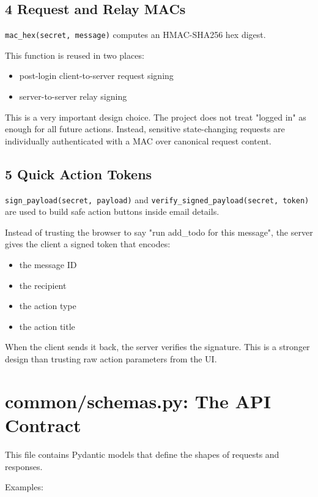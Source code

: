 \documentclass[11pt,a4paper]{article}
\begin{document}
\subsection{4 Request and Relay MACs}

\nolinkurl{mac_hex(secret, message)} computes an HMAC-SHA256 hex digest.

This function is reused in two places:

\begin{itemize}
\item post-login client-to-server request signing
\item server-to-server relay signing
\end{itemize}

This is a very important design choice. The project does not treat "logged in" as enough for all future actions. Instead, sensitive state-changing requests are individually authenticated with a MAC over canonical request content.

\subsection{5 Quick Action Tokens}

\nolinkurl{sign_payload(secret, payload)} and \nolinkurl{verify_signed_payload(secret, token)} are used to build safe action buttons inside email details.

Instead of trusting the browser to say "run add\_todo for this message", the server gives the client a signed token that encodes:

\begin{itemize}
\item the message ID
\item the recipient
\item the action type
\item the action title
\end{itemize}

When the client sends it back, the server verifies the signature. This is a stronger design than trusting raw action parameters from the UI.


\section{common/schemas.py: The API Contract}

This file contains Pydantic models that define the shapes of requests and responses.

Examples:
\end{document}
